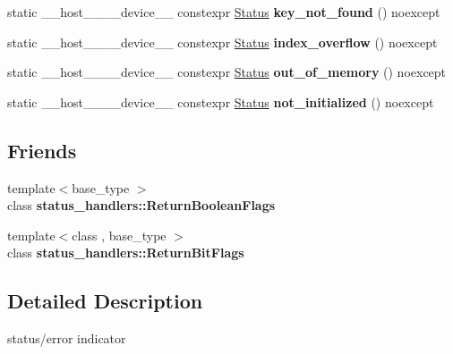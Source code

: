 \begin{DoxyCompactItemize}
\item 
\mbox{\label{classwarpcore_1_1Status_a8e176acb5cfd8b1b026b88a444e34ab1}} 
static \+\_\+\+\_\+host\+\_\+\+\_\+\+\_\+\+\_\+device\+\_\+\+\_\+ constexpr \hyperlink{classwarpcore_1_1Status}{Status} {\bfseries key\+\_\+not\+\_\+found} () noexcept
\item 
\mbox{\label{classwarpcore_1_1Status_a4e4781413f6a4fa4591849823b4bc271}} 
static \+\_\+\+\_\+host\+\_\+\+\_\+\+\_\+\+\_\+device\+\_\+\+\_\+ constexpr \hyperlink{classwarpcore_1_1Status}{Status} {\bfseries index\+\_\+overflow} () noexcept
\item 
\mbox{\label{classwarpcore_1_1Status_a824c87b7a9603002bb3371a0430c7d9e}} 
static \+\_\+\+\_\+host\+\_\+\+\_\+\+\_\+\+\_\+device\+\_\+\+\_\+ constexpr \hyperlink{classwarpcore_1_1Status}{Status} {\bfseries out\+\_\+of\+\_\+memory} () noexcept
\item 
\mbox{\label{classwarpcore_1_1Status_a8f8d84042630b330c067fe949bd69f56}} 
static \+\_\+\+\_\+host\+\_\+\+\_\+\+\_\+\+\_\+device\+\_\+\+\_\+ constexpr \hyperlink{classwarpcore_1_1Status}{Status} {\bfseries not\+\_\+initialized} () noexcept
\end{DoxyCompactItemize}
\subsection*{Friends}
\begin{DoxyCompactItemize}
\item 
\mbox{\label{classwarpcore_1_1Status_aa285d3faf42287d5cf638eac96fefbb3}} 
{\footnotesize template$<$base\+\_\+type $>$ }\\class {\bfseries status\+\_\+handlers\+::\+Return\+Boolean\+Flags}
\item 
\mbox{\label{classwarpcore_1_1Status_a30ea2f7ad3a7662f75bc4b901c9002bb}} 
{\footnotesize template$<$class , base\+\_\+type $>$ }\\class {\bfseries status\+\_\+handlers\+::\+Return\+Bit\+Flags}
\end{DoxyCompactItemize}


\subsection{Detailed Description}
status/error indicator 